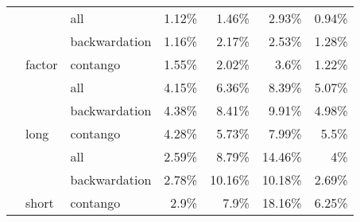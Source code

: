 \documentclass[]{elsarticle} %
\begin{document}
\begin{longtable}[t]{>{}lllrrrr}
\cmidrule{1-7}\pagebreak[0]
 &  & all & 1.12\% & 1.46\% & 2.93\% & 0.94\%\\
\nopagebreak
 &  & backwardation & 1.16\% & 2.17\% & 2.53\% & 1.28\%\\
\nopagebreak
 & \multirow[t]{-3}{*}{\raggedright\arraybackslash factor} & contango & 1.55\% & 2.02\% & 3.6\% & 1.22\%\\
\nopagebreak
 &  & all & 4.15\% & 6.36\% & 8.39\% & 5.07\%\\
\nopagebreak
 &  & backwardation & 4.38\% & 8.41\% & 9.91\% & 4.98\%\\
\nopagebreak
 & \multirow[t]{-3}{*}{\raggedright\arraybackslash long} & contango & 4.28\% & 5.73\% & 7.99\% & 5.5\%\\
\nopagebreak
 &  & all & 2.59\% & 8.79\% & 14.46\% & 4\%\\
\nopagebreak
 &  & backwardation & 2.78\% & 10.16\% & 10.18\% & 2.69\%\\
\nopagebreak
\multirow[t]{-9}{*}{\raggedright\arraybackslash \textbf{term structure}} & \multirow[t]{-3}{*}{\raggedright\arraybackslash short} & contango & 2.9\% & 7.9\% & 18.16\% & 6.25\%\\*
\end{longtable}
\endgroup{}

\newpage

\begingroup\fontsize{9}{11}\selectfont
\end{document}
